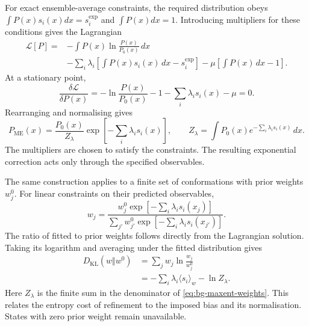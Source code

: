 For exact ensemble-average constraints, the required distribution obeys $\int P(x)s_i(x)dx=s_i^{\text{exp}}$ and $\int P(x)dx=1$. Introducing multipliers for these conditions gives the Lagrangian
\begin{equation}
    \begin{split}
    \mathcal{L}[P]={}&-\int P(x)\ln\frac{P(x)}{P_0(x)}\,dx\\
    &-\sum_i\lambda_i\left[\int P(x)s_i(x)\,dx-s_i^{\text{exp}}\right]
    -\mu\left[\int P(x)\,dx-1\right].
    \end{split}
    \label{eq:bg-maxent-lagrangian}
\end{equation}
At a stationary point,
\begin{equation}
    \frac{\delta\mathcal{L}}{\delta P(x)}
    =-\ln\frac{P(x)}{P_0(x)}-1-\sum_i\lambda_is_i(x)-\mu=0.
    \label{eq:bg-maxent-derivative}
\end{equation}
Rearranging and normalising gives
\begin{equation}
    P_{\text{ME}}(x)=\frac{P_0(x)}{Z_\lambda}
    \exp\!\left[-\sum_i\lambda_is_i(x)\right],
    \qquad
    Z_\lambda=\int P_0(x)e^{-\sum_i\lambda_is_i(x)}\,dx.
    \label{eq:bg-maxent-solution}
\end{equation}
The multipliers are chosen to satisfy the constraints. The resulting exponential correction acts only through the specified observables.\supercite{cesariUsingMaximumEntropy2018}

The same construction applies to a finite set of conformations with prior weights $w_j^0$. For linear constraints on their predicted observables,
\begin{equation}
    w_j=\frac{w_j^0\exp[-\sum_i\lambda_is_i(x_j)]}
    {\sum_{j'}w_{j'}^0\exp[-\sum_i\lambda_is_i(x_{j'})]}.
    \label{eq:bg-maxent-weights}
\end{equation}
The ratio of fitted to prior weights follows directly from the Lagrangian solution. Taking its logarithm and averaging under the fitted distribution gives
\begin{equation}
    \begin{split}
    D_{\text{KL}}(w\Vert w^0)
    &=\sum_jw_j\ln\frac{w_j}{w_j^0}\\
    &=-\sum_i\lambda_i\langle s_i\rangle_w-\ln Z_\lambda.
    \end{split}
    \label{eq:bg-kl-lagrangian}
\end{equation}
Here $Z_\lambda$ is the finite sum in the denominator of \cref{eq:bg-maxent-weights}. This relates the entropy cost of refinement to the imposed bias and its normalisation. States with zero prior weight remain unavailable.\supercite{cesariUsingMaximumEntropy2018,bradshawInterpretationHDXData2020}

